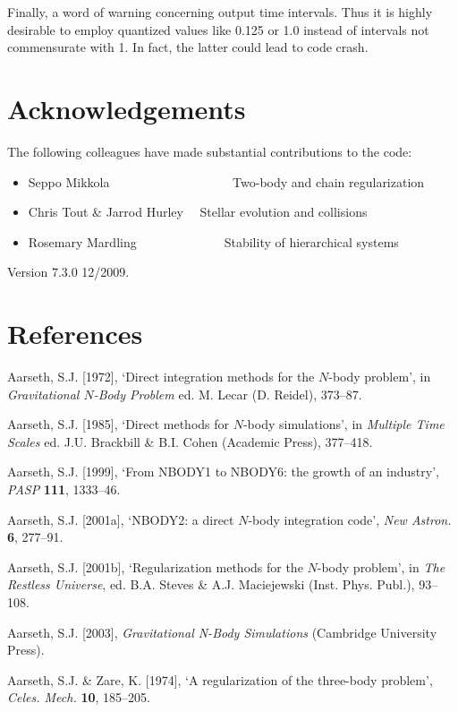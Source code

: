 \documentclass[12pt]{article}
\begin{document}
Finally, a word of warning concerning output time intervals.
Thus it is highly desirable to employ quantized values like 0.125 or 1.0
instead of intervals not commensurate with 1. In fact, the latter could
lead to code crash.

\section{Acknowledgements}

The following colleagues have made substantial contributions to the code:

\begin{itemize}

\item Seppo Mikkola ~~~~~~~~~~~~~~~~~~~Two-body and chain regularization
\item Chris Tout \& Jarrod Hurley ~~Stellar evolution and collisions
\item Rosemary Mardling~~~~~~~~~~~~~~Stability of hierarchical systems
\end{itemize}

\bigskip
Version 7.3.0 12/2009.

\newpage
\section*{References}

\medskip
\noindent
Aarseth, S.J. [1972], `Direct integration methods for the $N$-body problem',
in {\it Gravitational $N$-Body Problem} ed. M. Lecar (D. Reidel), 373--87.

\medskip
\noindent
Aarseth, S.J. [1985], `Direct methods for $N$-body simulations',
in {\it Multiple Time Scales} ed. J.U. Brackbill \& B.I. Cohen
(Academic Press), 377--418.

\medskip
\noindent
Aarseth, S.J. [1999], `From NBODY1 to NBODY6: the growth of an industry',
{\it PASP} {\bf 111}, 1333--46.

\medskip
\noindent
Aarseth, S.J. [2001a], `NBODY2: a direct $N$-body integration code',
{\it New Astron.} {\bf 6}, 277--91.

\medskip
\noindent
Aarseth, S.J. [2001b], `Regularization methods for the $N$-body problem',
in {\it The Restless Universe}, ed. B.A. Steves \& A.J. Maciejewski
(Inst. Phys. Publ.), 93--108.

\medskip
\noindent
Aarseth, S.J. [2003], {\it Gravitational N-Body Simulations} (Cambridge University Press).

\medskip
\noindent
Aarseth, S.J. \& Zare, K. [1974], `A regularization of the three-body problem',
{\it Celes. Mech.} {\bf 10}, 185--205.
\end{document}
